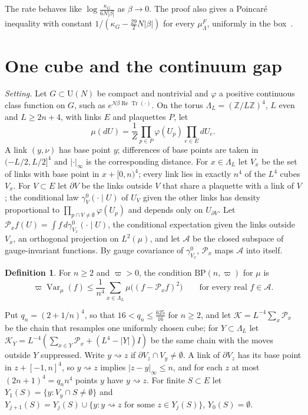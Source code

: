 \documentclass[11pt]{amsart}
\theoremstyle{definition}
\newtheorem{definition}[theorem]{Definition}
\theoremstyle{remark}
\numberwithin{equation}{section}
\newcommand{\Z}{\mathbb{Z}}
\newcommand{\U}{\mathrm{U}}
\newcommand{\ReTr}{\operatorname{Re}\operatorname{Tr}}
\newcommand{\Var}{\operatorname{Var}}
\newcommand{\BP}{\mathrm{BP}}
\begin{document}
The rate behaves like $\log\frac{\kappa_G}{6N|\beta|}$ as $\beta\to0$. The proof
also gives a Poincar\'e inequality with constant $1/(\kappa_G-\frac{29}2N|\beta|)$
for every $\mu^F_\Lambda$, uniformly in the box~\cite[Cor.~5.7.2]{BGL14}.

\section{One cube and the continuum gap}\label{sec:cube}

\emph{Setting.} Let $G\subset\U(N)$ be compact and nontrivial and $\varphi$ a
positive continuous class function on $G$, such as $e^{N\beta\ReTr(\cdot)}$. On
the torus $\Lambda_L=(\Z/L\Z)^4$, $L$ even and $L\ge2n+4$, with links $E$ and
plaquettes $P$, let
\[
\mu(dU)=\frac1Z\prod_{p\in P}\varphi(U_p)\prod_{e\in E}dU_e .
\]
A link $(y,\nu)$ has base point $y$; differences of base points are taken in
$(-L/2,L/2]^4$ and $|\cdot|_\infty$ is the corresponding distance. For
$x\in\Lambda_L$ let $V_x$ be the set of links with base point in $x+[0,n)^4$;
every link lies in exactly $n^4$ of the $L^4$ cubes $V_x$. For $V\subset E$ let
$\partial V$ be the links outside $V$ that share a plaquette with a link of
$V$; the conditional law $\gamma^0_V(\cdot\mid U)$ of $U_V$ given the other links
has density proportional to $\prod_{p\cap V\ne\emptyset}\varphi(U_p)$ and depends
only on $U_{\partial V}$. Let $\mathcal P_xf(U)=\int f\,d\gamma^0_{V_x}(\cdot\mid U)$,
the conditional expectation given the links outside $V_x$, an orthogonal
projection on $L^2(\mu)$, and let $\mathcal A$ be the closed subspace of
gauge-invariant functions. By gauge covariance of $\gamma^0_{V_x}$, $\mathcal P_x$
maps $\mathcal A$ into itself.

\begin{definition}\label{def:bp}
For $n\ge2$ and $\varpi>0$, the condition $\BP(n,\varpi)$ for $\mu$ is
\[
\varpi\Var_\mu(f)\le\frac1{n^4}\sum_{x\in\Lambda_L}\mu\bigl((f-\mathcal P_xf)^2\bigr)
\qquad\text{for every real }f\in\mathcal A .
\]
\end{definition}

Put $q_n=(2+1/n)^4$, so that $16<q_n\le\frac{625}{16}$ for $n\ge2$, and let
$\mathcal K=L^{-4}\sum_x\mathcal P_x$ be the chain that resamples one uniformly
chosen cube; for $Y\subset\Lambda_L$ let $\mathcal K_Y=L^{-4}(\sum_{x\in Y}\mathcal P_x
+(L^4-|Y|)I)$ be the same chain with the moves outside $Y$ suppressed. Write
$y\rightsquigarrow z$ if $\partial V_z\cap V_y\ne\emptyset$. A link of $\partial
V_z$ has its base point in $z+[-1,n]^4$, so $y\rightsquigarrow z$ implies
$|z-y|_\infty\le n$, and for each $z$ at most $(2n+1)^4=q_nn^4$ points $y$ have
$y\rightsquigarrow z$. For finite $S\subset E$ let $Y_1(S)=\{y:V_y\cap S\ne
\emptyset\}$ and $Y_{j+1}(S)=Y_j(S)\cup\{y:y\rightsquigarrow z\text{ for some }
z\in Y_j(S)\}$, $Y_0(S)=\emptyset$.
\end{document}
